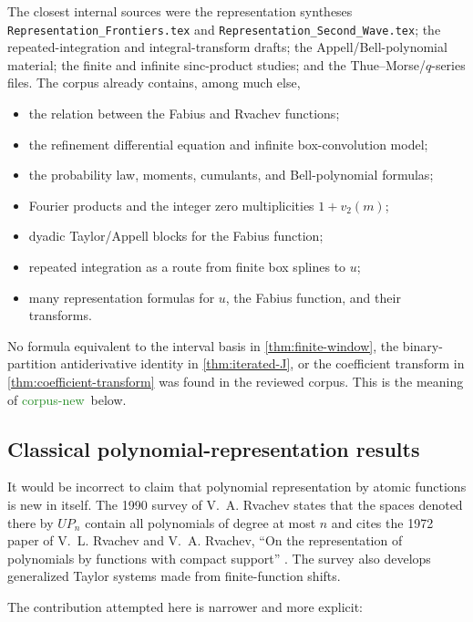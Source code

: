 \documentclass[11pt]{article}
\theoremstyle{definition}
\theoremstyle{remark}
\newcommand{\1}{\mathbf{1}}
\newcommand{\CorpusNew}{\textcolor{ForestGreen}{\textsf{corpus-new}}}
\begin{document}
The closest internal sources were the representation syntheses
\texttt{Representation\_Frontiers.tex} and
\texttt{Representation\_Second\_Wave.tex}; the repeated-integration and
integral-transform drafts; the Appell/Bell-polynomial material; the finite and
infinite sinc-product studies; and the Thue--Morse/$q$-series files.  The corpus
already contains, among much else,

\begin{itemize}
\item the relation between the Fabius and Rvachev functions;
\item the refinement differential equation and infinite box-convolution model;
\item the probability law, moments, cumulants, and Bell-polynomial formulas;
\item Fourier products and the integer zero multiplicities $1+v_2(m)$;
\item dyadic Taylor/Appell blocks for the Fabius function;
\item repeated integration as a route from finite box splines to $u$;
\item many representation formulas for $u$, the Fabius function, and their
  transforms.
\end{itemize}

No formula equivalent to the interval basis in \cref{thm:finite-window}, the
binary-partition antiderivative identity in \cref{thm:iterated-J}, or the
coefficient transform in \cref{thm:coefficient-transform} was found in the
reviewed corpus.  This is the meaning of \CorpusNew\ below.

\subsection{Classical polynomial-representation results}

It would be incorrect to claim that polynomial representation by atomic
functions is new in itself.  The 1990 survey of V.~A. Rvachev states that the
spaces denoted there by $UP_n$ contain all polynomials of degree at most $n$ and
cites the 1972 paper of V.~L. Rvachev and V.~A. Rvachev, ``On the representation
of polynomials by functions with compact support'' \cite{RvachevRvachev1972,Rvachev1990}.
The survey also develops generalized Taylor systems made from finite-function
shifts.

The contribution attempted here is narrower and more explicit:
\end{document}
